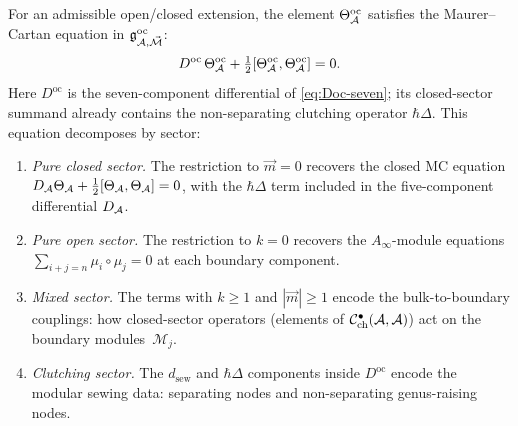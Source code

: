 \begin{theorem}
\label{thm:thqg-oc-mc-equation}
For an admissible open/closed extension, the element
$\Theta^{\mathrm{oc}}_{\mathcal{A}}$ satisfies the Maurer--Cartan equation in
$\mathfrak{g}^{\mathrm{oc}}_{\mathcal{A}, \vec{\mathcal{M}}}$:
\begin{equation}\label{eq:thqg-oc-mc-equation}
D^{\mathrm{oc}}\,\Theta^{\mathrm{oc}}_{\mathcal{A}}
+ \tfrac{1}{2}
[\Theta^{\mathrm{oc}}_{\mathcal{A}}, \Theta^{\mathrm{oc}}_{\mathcal{A}}]
= 0.
\end{equation}
Here $D^{\mathrm{oc}}$ is the seven-component differential of
\eqref{eq:Doc-seven}; its closed-sector summand already contains
the non-separating clutching operator $\hbar\Delta$.
This equation decomposes by sector:
\begin{enumerate}[label=\textup{(\alph*)}]
\item \emph{Pure closed sector.}
 The restriction to $\vec{m} = 0$ recovers the closed MC equation
 $D_{\mathcal{A}}\Theta_{\mathcal{A}} + \tfrac{1}{2}[\Theta_{\mathcal{A}}, \Theta_{\mathcal{A}}]
 = 0$, with the $\hbar\Delta$ term included in the five-component
 differential $D_{\mathcal{A}}$.
\item \emph{Pure open sector.}
 The restriction to $k = 0$ recovers the $A_\infty$-module
 equations $\sum_{i+j = n} \mu_i \circ \mu_j = 0$ at each
 boundary component.
\item \emph{Mixed sector.}
 The terms with $k \ge 1$ and $|\vec{m}| \ge 1$ encode the
 bulk-to-boundary couplings: how closed-sector operators
 (elements of $\mathcal{C}^{\bullet}_{\mathrm{ch}}(\mathcal{A}, \mathcal{A})$)
 act on the boundary modules~$\mathcal{M}_j$.
\item \emph{Clutching sector.}
 The $d_{\mathrm{sew}}$ and $\hbar\Delta$ components inside
 $D^{\mathrm{oc}}$ encode the modular sewing data: separating
 nodes and non-separating genus-raising nodes.
\end{enumerate}
\end{theorem}

